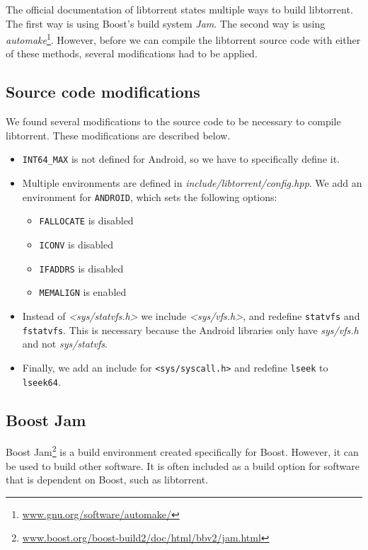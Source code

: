 		The official documentation of libtorrent states multiple ways to build libtorrent. The first way is using Boost's build system \emph{Jam}. The second way is using \emph{automake}\footnote{\href{http://www.gnu.org/software/automake/}{www.gnu.org/software/automake/}}. However, before we can compile the libtorrent source code with either of these methods, several modifications had to be applied.
		
		\subsection{Source code modifications}
				
		We found several modifications to the source code to be necessary to compile libtorrent. These modifications are described below.
		
		\begin{itemize}
		\item \texttt{INT64\_MAX} is not defined for Android, so we have to specifically define it.
		\item Multiple environments are defined in \emph{include/libtorrent/config.hpp}. We add an environment for \texttt{ANDROID}, which sets the following options:
			\begin{itemize}
				\item \texttt{FALLOCATE} is disabled
				\item \texttt{ICONV} is disabled
				\item \texttt{IFADDRS} is disabled
				\item \texttt{MEMALIGN} is enabled
			\end{itemize}
		\item Instead of \emph{<sys/statvfs.h>} we include \emph{<sys/vfs.h>}, and redefine \texttt{statvfs} and \texttt{fstatvfs}. This is necessary because the Android libraries only have \emph{sys/vfs.h} and not \emph{sys/statvfs}.
		\item Finally, we add an include for \texttt{<sys/syscall.h>} and redefine \texttt{lseek} to \texttt{lseek64}.
		\end{itemize}
		
		\subsection{Boost Jam}
		Boost Jam\footnote{\href{http://www.boost.org/boost-build2/doc/html/bbv2/jam.html}{www.boost.org/boost-build2/doc/html/bbv2/jam.html}} is a build environment created specifically for Boost. However, it can be used to build other software. It is often included as a build option for software that is dependent on Boost, such as libtorrent.
		

